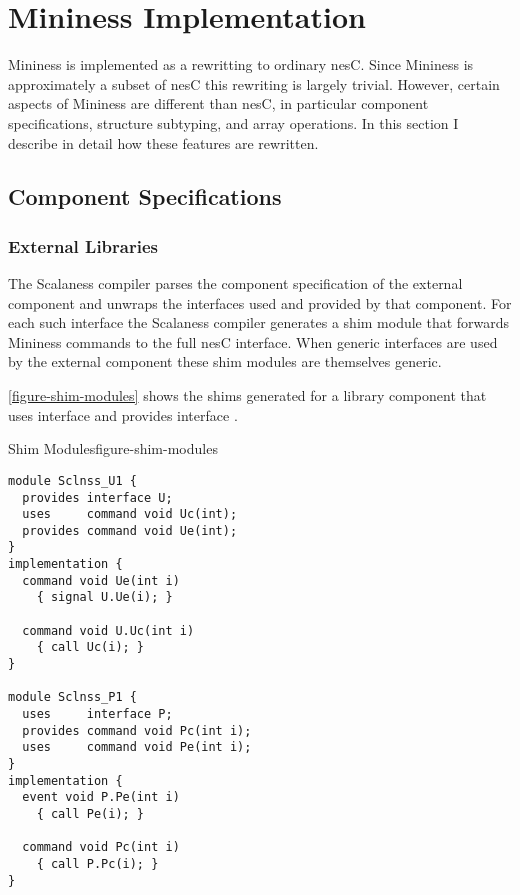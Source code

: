 \chapter{Mininess Implementation}
\label{chap:mininess-implementation}

Mininess is implemented as a rewritting to ordinary nesC. Since Mininess is approximately a
subset of nesC this rewriting is largely trivial. However, certain aspects of Mininess are
different than nesC, in particular component specifications, structure subtyping, and array
operations. In this section I describe in detail how these features are rewritten.

\section{Component Specifications}
\label{sec:component-specifications-implementation}


\subsection{External Libraries}
\label{sec:external-libraries-implementation}

 The Scalaness compiler parses the component
specification of the external component and unwraps the interfaces used and provided by that
component. For each such interface the Scalaness compiler generates a shim module that forwards
Mininess commands to the full nesC interface. When generic interfaces are used by the external
component these shim modules are themselves generic.

\autoref{figure-shim-modules} shows the shims generated for a library component
 that uses interface  and provides interface .

\singlespace
\begin{fpfig}[tbhp]{Shim Modules}{figure-shim-modules}
{
\begin{lstlisting}[language=nesC]
module Sclnss_U1 {
  provides interface U;
  uses     command void Uc(int);
  provides command void Ue(int);
}
implementation {
  command void Ue(int i)
    { signal U.Ue(i); }

  command void U.Uc(int i)
    { call Uc(i); }
}

module Sclnss_P1 {
  uses     interface P;
  provides command void Pc(int i);
  uses     command void Pe(int i);
}
implementation {
  event void P.Pe(int i)
    { call Pe(i); }

  command void Pc(int i)
    { call P.Pc(i); }
}
\end{lstlisting}
}
\end{fpfig}
\primaryspacing

